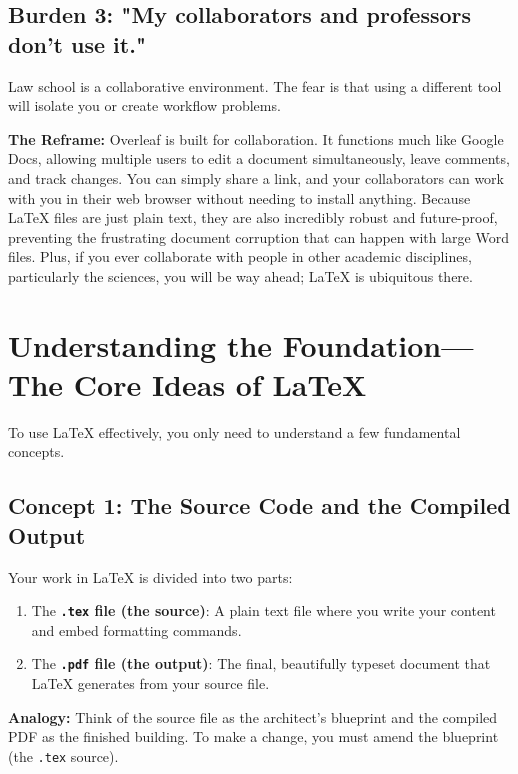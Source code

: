 \documentclass[12pt]{article}
\begin{document}
\subsection{Burden 3: "My collaborators and professors don't use it."}

Law school is a collaborative environment. The fear is that using a different tool will isolate you or create workflow problems.

\textbf{The Reframe:} Overleaf is built for collaboration. It functions much like Google Docs, allowing multiple users to edit a document simultaneously, leave comments, and track changes. You can simply share a link, and your collaborators can work with you in their web browser without needing to install anything. Because LaTeX files are just plain text, they are also incredibly robust and future-proof, preventing the frustrating document corruption that can happen with large Word files. Plus, if you ever collaborate with people in other academic disciplines, particularly the sciences, you will be way ahead; LaTeX is ubiquitous there.

\section{Understanding the Foundation—The Core Ideas of LaTeX}

To use LaTeX effectively, you only need to understand a few fundamental concepts.

\subsection{Concept 1: The Source Code and the Compiled Output}
Your work in LaTeX is divided into two parts:
\begin{enumerate}
    \item The \textbf{\texttt{.tex} file (the source)}: A plain text file where you write your content and embed formatting commands.
    \item The \textbf{\texttt{.pdf} file (the output)}: The final, beautifully typeset document that LaTeX generates from your source file.
\end{enumerate}

\textbf{Analogy:} Think of the source file as the architect's blueprint and the compiled PDF as the finished building. To make a change, you must amend the blueprint (the \texttt{.tex} source).
\end{document}

